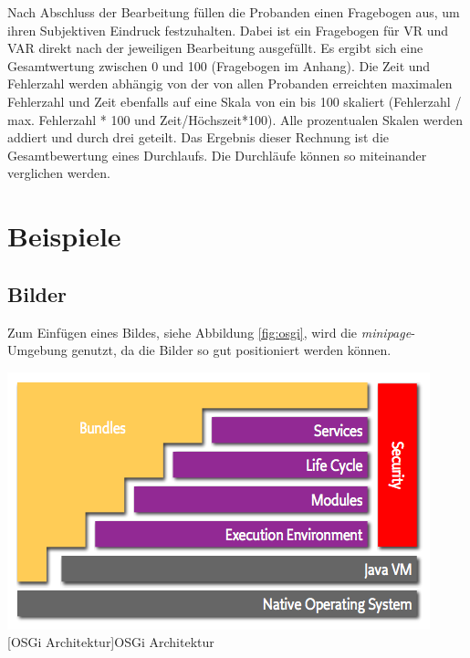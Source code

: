 \documentclass[12pt,a4paper,bibliography=totocnumbered,listof=totocnumbered]{scrartcl}
\begin{document}
Nach Abschluss der Bearbeitung füllen die Probanden einen Fragebogen aus, um ihren Subjektiven Eindruck festzuhalten.
Dabei ist ein Fragebogen für VR und VAR direkt nach der jeweiligen Bearbeitung ausgefüllt. Es ergibt sich eine Gesamtwertung zwischen 0 und 100 (Fragebogen im Anhang). Die Zeit und Fehlerzahl werden abhängig von der von allen Probanden erreichten maximalen Fehlerzahl und Zeit ebenfalls auf eine Skala von ein bis 100 skaliert (Fehlerzahl / max. Fehlerzahl * 100 und Zeit/Höchszeit*100). Alle prozentualen Skalen werden addiert und durch drei geteilt. Das Ergebnis dieser Rechnung ist die Gesamtbewertung eines Durchlaufs. Die Durchläufe können so miteinander verglichen werden.
\renewcommand\refname{Quellenverzeichnis}


\pagebreak
\section{Beispiele}
\subsection{Bilder}
Zum Einfügen eines Bildes, siehe Abbildung \ref{fig:osgi}, wird die \textit{minipage}-Umgebung genutzt, da die Bilder so gut positioniert werden können.

\vspace{1em}
\begin{minipage}{\linewidth}
	\centering
	\includegraphics[width=0.7\linewidth]{Bilder/layering-osgi.png}
	[OSGi Architektur]{OSGi Architektur\footnotemark }
	\label{fig:osgi}
\end{minipage}
\end{document}
